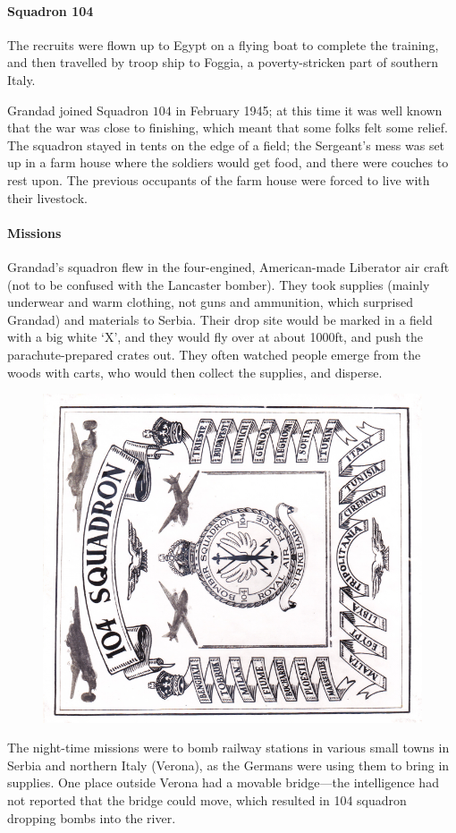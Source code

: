 \paragraph{Squadron 104} The recruits were flown up to Egypt on a flying boat to complete the training, and
then travelled by troop ship to Foggia, a poverty-stricken part of southern Italy.

Grandad joined Squadron $104$ in February 1945; at this time it was well known that
the war was close to finishing, which meant that some folks felt some relief. The
squadron stayed in tents on the edge of a field; the Sergeant's mess was set up
in a farm house where the soldiers would get food, and there were couches to rest upon.
The previous occupants of the farm house were forced to live with their livestock.

\paragraph{Missions} Grandad's squadron flew in the four-engined, American-made Liberator air craft (not to be
confused with the Lancaster bomber). They
took supplies (mainly underwear and warm clothing, not guns and ammunition, which surprised Grandad)
and materials to Serbia. Their drop site would
be marked in a field with a big white `X', and they would fly over at about 1000ft, and push
the parachute-prepared crates out. They often watched people emerge from the woods with carts,
who would then collect the supplies, and disperse.

\begin{figure}
	\centering
	\includegraphics[width=.7\textwidth]{squadron104}
\end{figure}
The night-time missions were to bomb railway stations in various small towns in Serbia and northern Italy (Verona),
as the Germans were using them to bring in supplies. One place outside Verona had a movable bridge---the
intelligence had not reported that the bridge could move, which resulted in 104 squadron dropping bombs into
the river.


